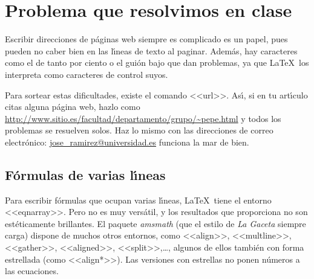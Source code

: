 \documentclass[autocontact]{gaceta}
\begin{document}
\section{Problema que resolvimos en clase}

Escribir direcciones de p\'aginas web siempre es complicado es un papel, pues pueden no caber bien en las l\'{\i}neas de texto al paginar. Adem\'as, hay caracteres como el de tanto por ciento o el gui\'on bajo que dan problemas, ya que \LaTeX\ los interpreta como caracteres de control suyos.

Para sortear estas dificultades, existe el comando <<url>>. As\'{\i}, si en tu art\'{\i}culo citas alguna p\'agina web, hazlo como
\url{http://www.sitio.es/facultad/departamento/grupo/~pepe.html}
y todos los problemas se resuelven solos. Haz lo mismo con las direcciones de correo electr\'onico: \url{jose_ramirez@universidad.es} funciona la mar de bien.


\subsection{F\'ormulas de varias l\'{\i}neas}

Para escribir f\'ormulas que ocupan varias l\'{\i}neas, \LaTeX\ tiene el entorno <<eqnarray>>. Pero no es muy vers\'atil, y los resultados que proporciona no son est\'eticamente brillantes. El paquete \textit{amsmath} (que el estilo de \textit{La Gaceta} siempre carga) dispone de muchos otros entornos, como <<align>>, <<multline>>, <<gather>>, <<aligned>>, <<split>>,\dots, algunos de ellos tambi\'en con forma estrellada (como <<align*>>). Las versiones con estrellas no ponen n\'umeros a las ecuaciones.
\end{document}
